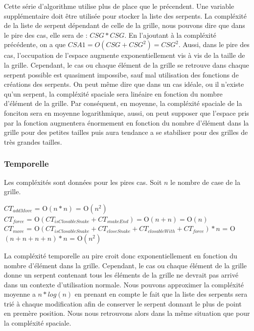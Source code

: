 \documentclass[a4paper,12pt]{report}
\begin{document}
Cette s\'erie d'algorithme utilise plus de place que le pr\'ecendent. Une variable suppl\'ementaire doit \^etre utilis\'ee pour stocker la liste des serpents. La compl\'exit\'e de la liste de serpent d\'ependant de celle de la grille, nous pouvons dire que dans le pire des cas, elle sera de : $CSG*CSG$. En l'ajoutant \`a la compl\'exit\'e pr\'ec\'edente, on a que $CSA1=O(CSG+CSG^2)=CSG^2$. Aussi, dans le pire des cas, l'occupation de l'espace augmente exponentiellement vis \`a vis de la taille de la grille. Cependant, le cas ou chaque \'el\'ement de la grille se retrouve dans chaque serpent possible est quasiment impossibe, sauf mal utilisation des fonctions de cr\'eations des serpents. On peut m\^eme dire que dans un cas id\'eale, ou il n'existe qu'un serpent, la compl\'exit\'e spaciale sera lin\'eaire en fonction du nombre d'\'el\'ement de la grille. Par cons\'equent, en moyenne, la compl\'exit\'e spaciale de la fonciton sera en moyenne logarithmique, aussi, on peut supposer que l'espace pris par la fonction augmentera \'enormement en fonction du nombre d'\'el\'ement dans la grille pour des petites tailles puis aura tendance a se stabiliser pour des grilles de tr\`es grandes tailles. 

\subsubsection{Temporelle}

Les compl\'exit\'es sont donn\'ees pour les pires cas. Soit $n$ le nombre de case de la grille.

$CT_{addMove}$ = O$(n*n)$ = O$(n^2)$ \\
$CT_{force}$ = O$(CT_{isClosableSnake}+CT_{snakeEnd}) = $O$(n+n) = $O$(n)$ \\
$CT_{move}$ = O$(CT_{isClosableSnake}+CT_{closeSnake}+CT_{closableWith}+CT_{force})*n$ = O$(n+n+n+n)*n$ = O$(n^2)$


La compl\'exit\'e temporelle au pire croit donc exponentiellement en fonction du nombre d'\'el\'ement dans la grille. Cependant, le cas ou chaque \'el\'ement de la grille donne un serpent contenant tous les \'el\'ements de la grille ne devrait pas arriv\'e dans un contexte d'utilisation normale. Nous pouvons approximer la compl\'exit\'e moyenne a $n*log(n)$ en prenant en compte le fait que la liste des serpents sera tri\'e \`a chaque modification afin de conserver le serpent donnant le plus de point en prem\`ere position. Nous nous retrouvons alors dans la m\^eme situation que pour la compl\'exit\'e spaciale. 
\end{document}

